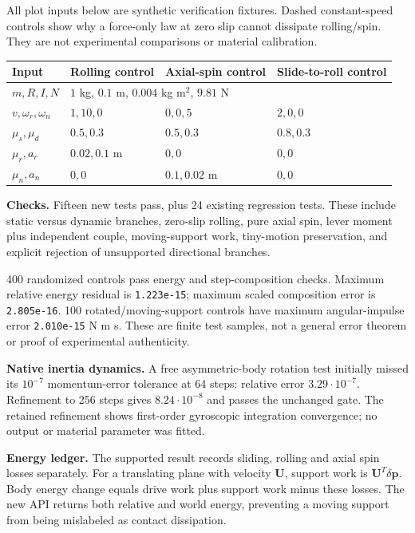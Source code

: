 \documentclass[10pt,a4paper]{article}
\begin{document}
All plot inputs below are synthetic verification fixtures. Dashed constant-speed
controls show why a force-only law at zero slip cannot dissipate rolling/spin.
They are not experimental comparisons or material calibration.

\begin{tabular}{llll}\hline
Input & Rolling control & Axial-spin control & Slide-to-roll control\\\hline
$m,R,I,N$ & \multicolumn{3}{l}{$1$ kg, $0.1$ m, $0.004$ kg m$^2$, $9.81$ N}\\
$v,\omega_r,\omega_n$ & $1,10,0$ & $0,0,5$ & $2,0,0$\\
$\mu_s,\mu_d$ & $0.5,0.3$ & $0.5,0.3$ & $0.8,0.3$\\
$\mu_r,a_r$ & $0.02,0.1$ m & $0,0$ & $0,0$\\
$\mu_n,a_n$ & $0,0$ & $0.1,0.02$ m & $0,0$\\\hline
\end{tabular}

\textbf{Checks.} Fifteen new tests pass, plus 24 existing regression tests. These
include static versus dynamic branches, zero-slip rolling, pure axial spin,
lever moment plus independent couple, moving-support work, tiny-motion preservation,
and explicit rejection of unsupported directional branches.

400 randomized controls pass energy and step-composition checks. Maximum relative
energy residual is \texttt{1.223e-15}; maximum scaled composition error is
\texttt{2.805e-16}. 100 rotated/moving-support controls have maximum
angular-impulse error \texttt{2.010e-15} N m s. These are finite test samples,
not a general error theorem or proof of experimental authenticity.

\textbf{Native inertia dynamics.} A free asymmetric-body rotation test initially
missed its $10^{-7}$ momentum-error tolerance at 64 steps: relative error
$3.29\cdot10^{-7}$. Refinement to 256 steps gives $8.24\cdot10^{-8}$ and passes
the unchanged gate. The retained refinement shows first-order gyroscopic
integration convergence; no output or material parameter was fitted.

\textbf{Energy ledger.} The supported result records sliding, rolling and axial
spin losses separately. For a translating plane with velocity $\boldsymbol U$,
support work is $\boldsymbol U^T\delta\boldsymbol p$. Body energy change equals
drive work plus support work minus these losses. The new API returns both
relative and world energy, preventing a moving support from being mislabeled
as contact dissipation.
\newpage
\end{document}
